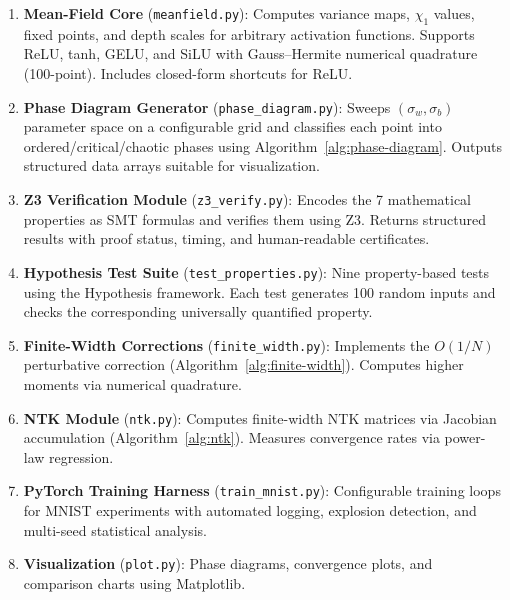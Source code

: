 \documentclass[10pt]{article}
\begin{document}
\begin{enumerate}[nosep]
    \item \textbf{Mean-Field Core} (\texttt{meanfield.py}):
    Computes variance maps, $\chi_1$ values, fixed points, and depth scales for arbitrary activation functions.
    Supports ReLU, tanh, GELU, and SiLU with Gauss--Hermite numerical quadrature (100-point).
    Includes closed-form shortcuts for ReLU.

    \item \textbf{Phase Diagram Generator} (\texttt{phase\_diagram.py}):
    Sweeps $(\sigma_w, \sigma_b)$ parameter space on a configurable grid and classifies each point into ordered/critical/chaotic phases using Algorithm~\ref{alg:phase-diagram}.
    Outputs structured data arrays suitable for visualization.

    \item \textbf{Z3 Verification Module} (\texttt{z3\_verify.py}):
    Encodes the 7 mathematical properties as SMT formulas and verifies them using Z3.
    Returns structured results with proof status, timing, and human-readable certificates.

    \item \textbf{Hypothesis Test Suite} (\texttt{test\_properties.py}):
    Nine property-based tests using the Hypothesis framework.
    Each test generates 100 random inputs and checks the corresponding universally quantified property.

    \item \textbf{Finite-Width Corrections} (\texttt{finite\_width.py}):
    Implements the $O(1/N)$ perturbative correction (Algorithm~\ref{alg:finite-width}).
    Computes higher moments via numerical quadrature.

    \item \textbf{NTK Module} (\texttt{ntk.py}):
    Computes finite-width NTK matrices via Jacobian accumulation (Algorithm~\ref{alg:ntk}).
    Measures convergence rates via power-law regression.

    \item \textbf{PyTorch Training Harness} (\texttt{train\_mnist.py}):
    Configurable training loops for MNIST experiments with automated logging, explosion detection, and multi-seed statistical analysis.

    \item \textbf{Visualization} (\texttt{plot.py}):
    Phase diagrams, convergence plots, and comparison charts using Matplotlib.
\end{enumerate}
\end{document}
